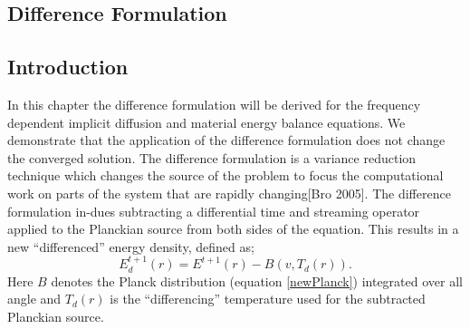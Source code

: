 
\begin{center}
\section{Difference Formulation}
\label{sec:DifferenceFormulation}
\end{center}

\aboveSubSecSkip

\subsection{Introduction}
\label{sec:DifferenceFormulation-Intro}

\noindent
	\indent In this chapter the difference formulation will be derived for the frequency dependent implicit diffusion and material energy balance equations. We demonstrate that the application of the difference formulation does not change the converged solution. The difference formulation is a variance reduction technique which changes the source of the problem to focus the computational work on parts of the system that are rapidly changing[Bro 2005]. The difference formulation in-dues subtracting a differential time and streaming operator applied to the Planckian source from both sides of the equation. This results in a new ``differenced'' energy density, defined as;
	\begin{equation}
	\label{newEnergyDensity}
	E^{t+1}_{d}(r)=E^{t+1}(r)-B{(v,T_{d}(r))}.
	\end{equation}
	Here $B$ denotes the Planck distribution (equation \ref{newPlanck}) integrated over all angle and $T_d(r)$ is the ``differencing'' temperature used for the subtracted Planckian source.

\belowSubSecSkip

